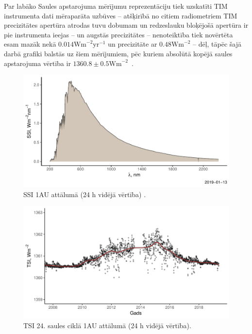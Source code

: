 Par labāko Saules apstarojuma mērījumu reprezentāciju tiek uzskatīti TIM instrumenta dati mēraparāta uzbūves -- atšķirībā no citiem radiometriem TIM precizitātes apertūra atrodas tuvu dobumam un redzeslauku bloķējošā apertūra ir pie instrumenta ieejas -- un augstās precizitātes -- nenoteiktība tiek novērtēta esam mazāk nekā $0.014\textrm{Wm}^{-2}\textrm{yr}^{-1}$ un precizitāte ar $0.48\textrm{Wm}^{-2}$ \cite{TSIdata} -- dēļ, tāpēc šajā darbā grafiki balstās uz šiem mērījumiem, pēc kuriem absolūtā kopējā saules apstarojuma vērtība ir $1360.8 \pm 0.5 \textrm{Wm}^{-2}$~\cite{Frohlich2012}.

\begin{figure}[h]
    \centering
    \includegraphics[width=\linewidth]{figures/misc/SSI.pdf}
    \caption{SSI 1AU attālumā (24 h vidējā vērtība) \cite{SSIdata}.}
    \label{fig:SSI}
\end{figure}

\begin{figure}[h]
    \centering
    \includegraphics[width=\linewidth]{figures/misc/TSI_8-19.pdf}
    \caption{TSI 24. saules ciklā 1AU attālumā (24 h vidējā vērtība)\cite{TSIdata}.}
    \label{fig:TSI1}
\end{figure}

